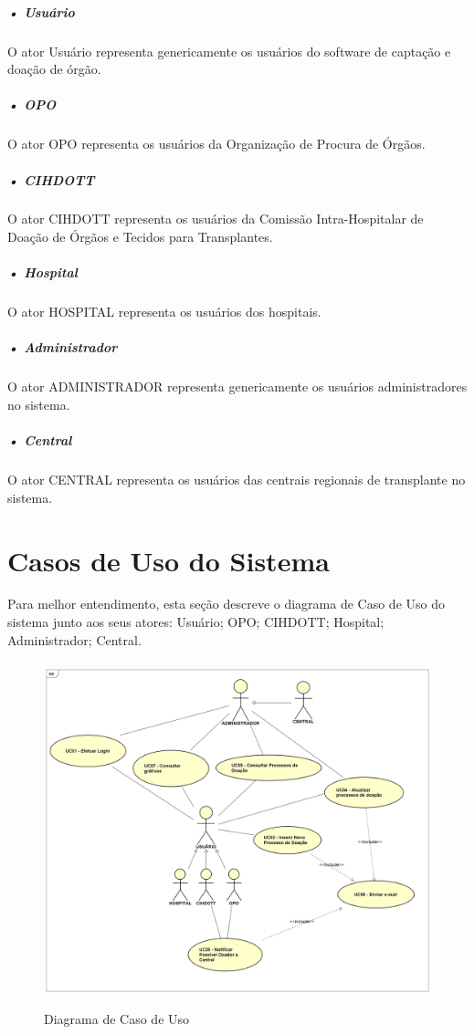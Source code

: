 \documentclass[portuguese,oneside]{tcc}
\begin{document}
\subparagraph{• Usuário}
O ator Usuário representa genericamente os usuários do software de captação e doação de órgão.

\subparagraph{• OPO}
O ator OPO representa os usuários da Organização de Procura de Órgãos.

\subparagraph{• CIHDOTT}
O ator CIHDOTT representa os usuários da Comissão Intra-Hospitalar de Doação de Órgãos e Tecidos para Transplantes.

\subparagraph{• Hospital}
O ator HOSPITAL representa os usuários dos hospitais.

\subparagraph{• Administrador}
O ator ADMINISTRADOR representa genericamente os usuários administradores no sistema.

\subparagraph{• Central}
O ator CENTRAL representa os usuários das centrais regionais de transplante no sistema.

\section{Casos de Uso do Sistema}
Para melhor entendimento, esta seção descreve o diagrama de Caso de Uso do sistema junto aos seus atores: Usuário; OPO; CIHDOTT; Hospital; Administrador; Central.

\paragraph{}
\begin{figure}[htp]
\centering
\caption{Diagrama de Caso de Uso}
\includegraphics[width=17cm]{uc}
\label{fig:uc-diagram}
\end{figure}
\end{document}
